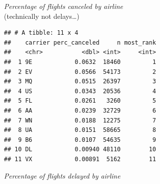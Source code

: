 \documentclass[]{book}
\newenvironment{Shaded}{\begin{snugshade}}{\end{snugshade}}
\newcommand{\DataTypeTok}[1]{\textcolor[rgb]{0.13,0.29,0.53}{#1}}
\newcommand{\DecValTok}[1]{\textcolor[rgb]{0.00,0.00,0.81}{#1}}
\newcommand{\KeywordTok}[1]{\textcolor[rgb]{0.13,0.29,0.53}{\textbf{#1}}}
\newcommand{\NormalTok}[1]{#1}
\newcommand{\OperatorTok}[1]{\textcolor[rgb]{0.81,0.36,0.00}{\textbf{#1}}}
\newcommand{\StringTok}[1]{\textcolor[rgb]{0.31,0.60,0.02}{#1}}
\theoremstyle{definition}
\theoremstyle{definition}
\theoremstyle{definition}
\theoremstyle{remark}
\begin{document}
\emph{Percentage of flights canceled by airline}\\
(technically not delays\ldots{})

\begin{Shaded}
\end{Shaded}

\begin{verbatim}
## # A tibble: 11 x 4
##    carrier perc_canceled     n most_rank
##    <chr>           <dbl> <int>     <int>
##  1 9E            0.0632  18460         1
##  2 EV            0.0566  54173         2
##  3 MQ            0.0515  26397         3
##  4 US            0.0343  20536         4
##  5 FL            0.0261   3260         5
##  6 AA            0.0239  32729         6
##  7 WN            0.0188  12275         7
##  8 UA            0.0151  58665         8
##  9 B6            0.0107  54635         9
## 10 DL            0.00940 48110        10
## 11 VX            0.00891  5162        11
\end{verbatim}

\emph{Percentage of flights delayed by airline}
\end{document}

